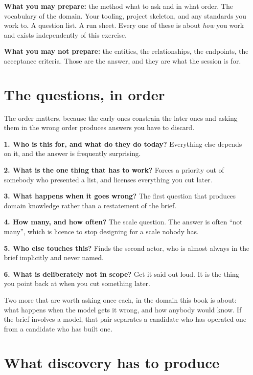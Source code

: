 \begin{kitmethod}
\textbf{What you may prepare:} the method \dash{} what to ask and in what
order. The vocabulary of the domain. Your tooling, project skeleton, and any
standards you work to. A question list. A run sheet. Every one of these is
about \emph{how} you work and exists independently of this exercise.

\textbf{What you may not prepare:} the entities, the relationships, the
endpoints, the acceptance criteria. Those are the answer, and they are what the
session is for.
\end{kitmethod}

\section{The questions, in order}

The order matters, because the early ones constrain the later ones and asking
them in the wrong order produces answers you have to discard.

\begin{kitmethod}
\textbf{1. Who is this for, and what do they do today?} Everything else depends
on it, and the answer is frequently surprising.

\textbf{2. What is the one thing that has to work?} Forces a priority out of
somebody who presented a list, and licenses everything you cut later.

\textbf{3. What happens when it goes wrong?} The first question that produces
domain knowledge rather than a restatement of the brief.

\textbf{4. How many, and how often?} The scale question. The answer is often
``not many'', which is licence to stop designing for a scale nobody has.

\textbf{5. Who else touches this?} Finds the second actor, who is almost always
in the brief implicitly and never named.

\textbf{6. What is deliberately not in scope?} Get it said out loud. It is the
thing you point back at when you cut something later.
\end{kitmethod}

Two more that are worth asking once each, in the domain this book is about:
what happens when the model gets it wrong, and how anybody would know. If the
brief involves a model, that pair separates a candidate who has operated one
from a candidate who has built one.

\section{What discovery has to produce}

